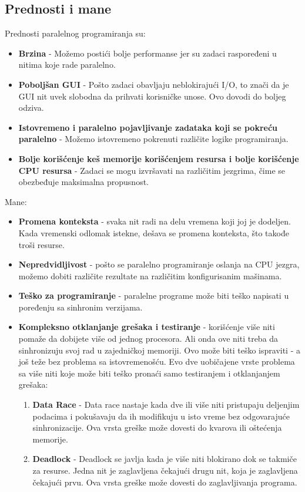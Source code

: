 \documentclass[a4paper]{article}
\begin{document}
{\subsection{Prednosti i mane}

Prednosti paralelnog programiranja su:
\begin{itemize}
\item \textbf{Brzina} - Možemo postići bolje performanse jer su zadaci raspoređeni u nitima koje rade paralelno.\cite{zoboko}
\item \textbf{Poboljšan GUI} - Pošto zadaci obavljaju neblokirajući I/O, to znači da je GUI nit uvek slobodna da prihvati korisničke unose. Ovo dovodi do boljeg odziva.\cite{zoboko}
\item \textbf{Istovremeno i paralelno pojavljivanje zadataka koji se pokreću paralelno} - Možemo istovremeno pokrenuti različite logike programiranja.\cite{zoboko}
\item \textbf{Bolje korišćenje keš memorije korišćenjem resursa i bolje korišćenje CPU resursa} - Zadaci se mogu izvršavati na različitim jezgrima, čime se obezbeđuje maksimalna propusnost.\cite{zoboko}\\
\end{itemize}
Mane:
\begin{itemize}
\item \textbf{Promena konteksta} - svaka nit radi na delu vremena koji joj je dodeljen. Kada vremenski odlomak istekne, dešava se promena konteksta, što takođe troši resurse.\cite{zoboko}
\item \textbf{Nepredvidljivost} - pošto se paralelno programiranje oslanja na CPU jezgra, možemo dobiti različite rezultate na različitim konfigurisanim mašinama.\cite{zoboko}
\item \textbf{Teško za programiranje} - paralelne programe može biti teško napisati u poređenju sa sinhronim verzijama.\cite{zoboko}
\item \textbf{Kompleksno otklanjanje grešaka i testiranje} - korišćenje više niti pomaže da dobijete više od jednog procesora. Ali onda ove niti treba da sinhronizuju svoj rad u zajedničkoj memoriji. Ovo može biti teško ispraviti - a još teže bez problema sa istovremenošću\cite{zoboko}.
Evo dve uobičajene vrste problema sa više niti koje može biti teško pronaći samo testiranjem i otklanjanjem grešaka:
\begin{enumerate}
\item \textbf{Data Race} - 
Data race nastaje kada dve ili više niti pristupaju deljenjim podacima i pokušavaju da ih modifikuju u isto vreme bez odgovarajuće sinhronizacije. Ova vrsta greške može dovesti do kvarova ili oštećenja memorije.\cite{perforce}
\item \textbf{Deadlock} - 
Deadlock se javlja kada je više niti blokirano dok se takmiče za resurse. Jedna nit je zaglavljena čekajući drugu nit, koja je zaglavljena čekajući prvu. Ova vrsta greške može dovesti do zaglavljivanja programa.\cite{perforce}
\end{enumerate}
\end{itemize}

}
\end{document}
